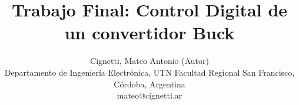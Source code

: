 \documentclass[10pt, a4paper, fleqn]{article}
\title{
    \centering \fontsize{24pt}{14pt}\selectfont \textbf{Trabajo Final: Control Digital de un convertidor Buck}
}
\author{
    \centering \fontsize{12pt}{14pt}\selectfont Cignetti, Mateo Antonio (Autor)\\
    \normalsize Departamento de Ingeniería Electrónica, UTN Facultad Regional San Francisco, Córdoba, Argentina \\
    mateo@cignetti.ar
    \vspace{0.5cm} %
}
\date{}
\begin{document}
    \maketitle
    \thispagestyle{fancy}

    
    

    
    
    

    \newpage
    

    \newpage
    \renewcommand{\refname}{\large REFERENCIAS}
    \begin{minipage}{0.96\textwidth}
    \printbibliography
    \end{minipage}
\end{document}
